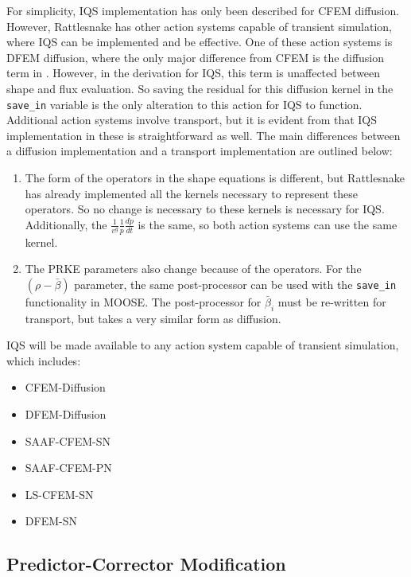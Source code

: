 For simplicity, IQS implementation has only been described for CFEM diffusion.  However, Rattlesnake has other action systems capable of transient simulation, where IQS can be implemented and be effective.  One of these action systems is DFEM diffusion, where the only major difference from CFEM is the diffusion term in .  However, in the derivation for IQS, this term is unaffected between shape and flux evaluation.  So saving the residual for this diffusion kernel in the \texttt{save\_in} variable is the only alteration to this action for IQS to function.\\
Additional action systems involve transport, but it is evident from  that IQS implementation in these is straightforward as well.  The main differences between a diffusion implementation and a transport implementation are outlined below:
\begin{enumerate}
\item The form of the operators in the shape equations is different, but Rattlesnake has already implemented all the kernels necessary to represent these operators.  So no change is necessary to these kernels is necessary for IQS.  Additionally, the $\frac{1}{v^g}\frac{1}{p}\frac{dp}{dt}$ is the same, so both action systems can use the same kernel.
\item The PRKE parameters also change because of the operators.  For the $(\rho-\bar{\beta})$ parameter, the same post-processor can be used with the \texttt{save\_in} functionality in MOOSE.  The post-processor for $\bar{\beta}_i$ must be re-written for transport, but takes a very similar form as diffusion.
\end{enumerate}

IQS will be made available to any action system capable of transient simulation, which includes:
\begin{itemize}
\item CFEM-Diffusion
\item DFEM-Diffusion
\item SAAF-CFEM-SN
\item SAAF-CFEM-PN
\item LS-CFEM-SN
\item DFEM-SN
\end{itemize}

\subsection{Predictor-Corrector Modification}


